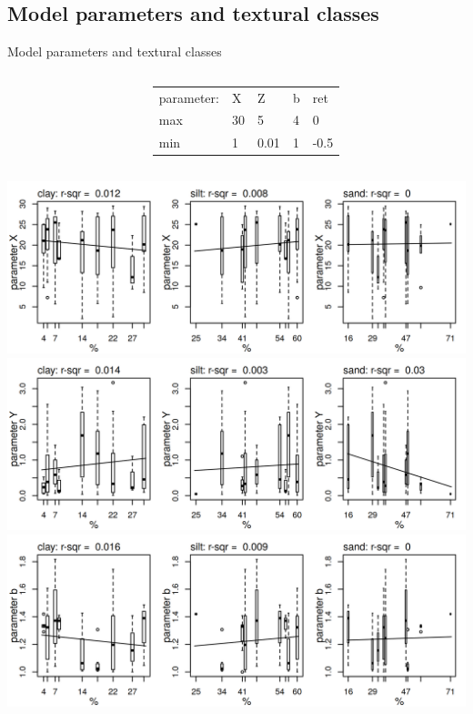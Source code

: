 \subsection{Model parameters and textural classes}
\begin{block}{Model parameters and textural classes}
\begin{columns}
    \begin{column}{0.2\textwidth}
    \end{column}
    \begin{column}{0.6\textwidth}

        \begin{table}[]
            \begin{tabular}{lllll}
            parameter: & X & Z & b & ret \\
            max & 30 & 5 & 4 & 0 \\
            min & 1 & 0.01 & 1 & -0.5 \\
            \end{tabular}
        \end{table}
    \end{column}
\end{columns} 

\includegraphics[width = \textwidth]{obr/Xfittex.png}
\includegraphics[width = \textwidth]{obr/Yfittex.png}
\includegraphics[width = \textwidth]{obr/bfittex.png}
\end{block}


